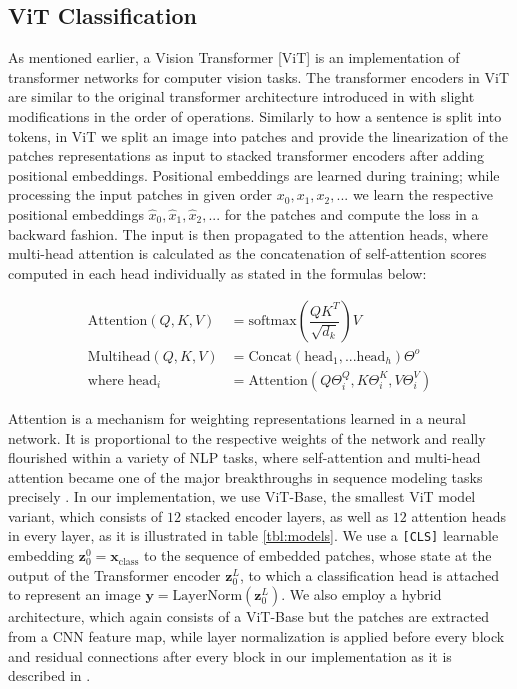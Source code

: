 \subsection{ViT Classification}
\label{sub:3.1}
As mentioned earlier, a Vision Transformer [ViT] \cite{visiontransformer} is an implementation of transformer networks for computer vision tasks. The transformer encoders in ViT are similar to the original transformer architecture introduced in \cite{vaswani2017attention} with slight modifications in the order of operations. Similarly to how a sentence is split into tokens, in ViT we split an image into patches and provide the linearization of the patches representations as input to stacked transformer encoders after adding positional embeddings. Positional embeddings are learned during training; while processing the input patches in given order $x_0, x_1, x_2, ...$ we learn the respective positional embeddings $\hat{x}_0, \hat{x}_1, \hat{x}_2, ...$ for the patches and compute the loss in a backward fashion. The input is then propagated to the attention heads, where multi-head attention is calculated as the concatenation of self-attention scores computed in each head individually as stated in the formulas below:

\begin{align*}
\text{Attention}(Q, K, V) &= \text{softmax}\left(\dfrac{QK^T}{\sqrt{d_k}}\right)V\\
\text{Multihead}(Q, K, V) &= \text{Concat}(\text{head}_1,...\text{head}_h)\Theta^o \\
\text{where head}_i &= \text{Attention}(Q\Theta_i^Q, K\Theta_i^K, V\Theta_i^V)
\end{align*}

Attention is a mechanism for weighting representations learned in a neural network. It is proportional to the respective weights of the network and really flourished within a variety of NLP tasks, where self-attention and multi-head attention became one of the major breakthroughs in sequence modeling tasks precisely \cite{guidedtransformer}. In our implementation, we use ViT-Base, the smallest ViT model variant, which consists of $12$ stacked encoder layers, as well as $12$ attention heads in every layer, as it is illustrated in table \ref{tbl:models}. We use a \texttt{[CLS]} learnable embedding $\mathbf{z}_0^0
= \mathbf{x}_{\text{class}}$ to the sequence of embedded patches, whose state at the output of the Transformer encoder $\mathbf{z}_0^L$, to which a classification head is attached to represent an image $\mathbf{y} = \text{LayerNorm}(\mathbf{z}_0^L)$. We also employ a hybrid architecture, which again consists of a ViT-Base but the patches are extracted from a CNN feature map, while layer normalization is applied before
every block and residual connections after every block in our implementation as it is described in \cite{visiontransformer}.

